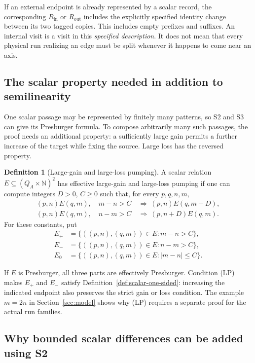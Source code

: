 \documentclass[11pt,a4paper]{article}
\theoremstyle{definition}
\newtheorem{definition}[theorem]{Definition}
\theoremstyle{remark}
\newcommand{\N}{\mathbb N}
\begin{document}
If an external endpoint is already represented by a scalar record,
the corresponding \(R_{\mathrm{in}}\) or \(R_{\mathrm{out}}\) includes
the explicitly specified identity change between its two tagged
copies. This includes empty prefixes and suffixes.
An internal visit is a visit in this \emph{specified description}.
It does not mean that every physical run realizing an edge must be
split whenever it happens to come near an axis.

\subsection{The scalar property needed in addition to semilinearity}

One scalar passage may be represented by finitely many patterns, so
S2 and S3 can give its Presburger formula. To compose arbitrarily many
such passages, the proof needs an additional property: a sufficiently
large gain permits a further increase of the target while fixing the
source. Large loss has the reversed property.

\begin{definition}[Large-gain and large-loss pumping]
\label{def:large-pumping}
A scalar relation \(E\subseteq(Q_A\times\N)^2\) has effective
large-gain and large-loss pumping if one can compute integers
\(D>0\), \(C\ge0\) such that, for every \(p,q,n,m\),
\[
\begin{split}
 (p,n)E(q,m),\quad m-n>C
   &\ \Longrightarrow\ (p,n)E(q,m+D),\\
 (p,n)E(q,m),\quad n-m>C
   &\ \Longrightarrow\ (p,n+D)E(q,m).
\end{split}
\tag{LP}
\]
For these constants, put
\[
\begin{split}
 E_+&=\{((p,n),(q,m))\in E:m-n>C\},\\
 E_-&=\{((p,n),(q,m))\in E:n-m>C\},\\
 E_0&=\{((p,n),(q,m))\in E:|m-n|\le C\}.
\end{split}
\]
\end{definition}

If \(E\) is Presburger, all three parts are effectively Presburger.
Condition (LP) makes \(E_+\) and \(E_-\) satisfy
Definition~\ref{def:scalar-one-sided}: increasing the indicated
endpoint also preserves the strict gain or loss condition.
The example \(m=2n\) in Section~\ref{sec:model} shows why (LP)
requires a separate proof for the actual run families.

\subsection{Why bounded scalar differences can be added using S2}
\end{document}
